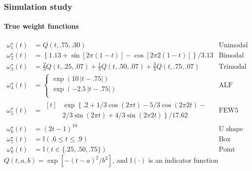 \documentclass{snedecorbeamer}
\begin{document}
\begin{frame}%
  \label{frm:simulation-true}
  \frametitle{Simulation study}
  \framesubtitle{True weight functions}

  \vspace{-2ex}
  {\small
    \begin{align*}
      \omega^\star_1(t)
      &=Q(t, .75, .30)
      &\text{Unimodal} \\
      \omega^\star_2(t)
      &=\left\{1.13 + \sin[2\pi(1-t)] - \cos[2\pi2(1-t)]\right\} / 3.13
      &\text{Bimodal} \\
      \omega^\star_3(t)
      &=\frac{2}{3} Q(t, .25, .07)+
        \frac{1}{3} Q(t, .50, .07) +
        \frac{3}{3} Q(t, .75, .07)
      &\text{Trimodal} \\
      \omega^\star_4(t)
      &=
        \begin{cases}
          \exp\left(10\,\lvert t - .75 \rvert\right) \\
          \exp\left(-2.5\,\lvert t - .75 \rvert\right) \\
        \end{cases}
      &\text{ALF} \\
      \omega^\star_5(t)
      &=
        \begin{aligned}[t]
          &\exp\left\{\right.
          .2 +
          1/3 \cos(2\pi t) - 5/3 \cos(2\pi2t) - \\
          &2/3 \sin(2\pi t) + 4/3 \sin(2\pi2t)
          \left.\right\} / 17.62
        \end{aligned}
      &\text{FEW5} \\
      \omega^\star_6(t)
      &= {(2t - 1)}^{10}
      &\text{U shape} \\
      \omega^\star_7(t)
      &=\mathbb{I}(.6\le t \le.9)
      &\text{Box} \\
      \omega^\star_8(t)
      &=\mathbb{I}(t\in\{.25, .50, .75\})
      &\text{Point mass}
    \end{align*}
    $Q(t, a, b) = \exp\left[-{(t - a)}^2/b^2\right]$, and $\mathbb{I}(\cdot)$
    is an indicator function}
\end{frame}
\end{document}
